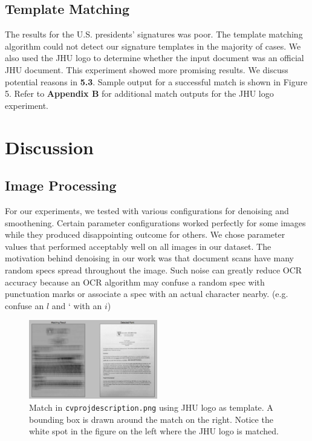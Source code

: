 \documentclass[11pt,letterpaper]{article}
\begin{document}
\subsection{Template Matching}

The results for the U.S. presidents' signatures was poor. The template matching algorithm could not detect our signature templates in the majority of cases. We also used the JHU logo to determine whether the input document was an official JHU document. This experiment showed more promising results. We discuss potential reasons in \textbf{5.3}. Sample output for a successful match is shown in Figure 5. Refer to \textbf{Appendix B} for additional match outputs for the JHU logo experiment.

\section{Discussion}

\subsection{Image Processing}

For our experiments, we tested with various configurations for denoising and smoothening. Certain parameter configurations worked perfectly for some images while they produced disappointing outcome for others. We chose parameter values that performed acceptably well on all images in our dataset. The motivation behind denoising in our work was that document scans have many random specs spread throughout the image. Such noise can greatly reduce OCR accuracy because an OCR algorithm may confuse a random spec with punctuation marks or associate a spec with an actual character nearby. (e.g. confuse an $l$ and ` with an $i$)

\begin{figure}[t!]
  \centering
  \includegraphics[keepaspectratio, width=0.5\textwidth]{match1.png}
  \caption{Match in {\tt cv\textunderscore proj\textunderscore description.png} using JHU logo as template. A bounding box is drawn around the match on the right. Notice the white spot in the figure on the left where the JHU logo is matched.}
\end{figure}
\end{document}
